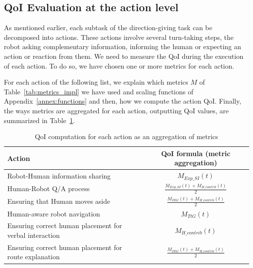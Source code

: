 \documentclass[a4paper,11pt,twoside]{StyleThese}
\begin{document}
\subsection{QoI Evaluation at the action level}\label{subsec:action_qoi}
As mentioned earlier, each subtask of the direction-giving task can be decomposed into actions. These actions involve several turn-taking steps, the robot asking complementary information, informing the human or expecting an action or reaction from them. We need to measure the QoI during the execution of each action. To do so, we have chosen one or more metrics for each action. 

For each action of the following list, we explain which metrics $M$ of Table~\ref{tab:metrics_impl} we have used and scaling functions of Appendix~\ref{annex:functions} and then, how we compute the action QoI. Finally, the ways metrics are aggregated for each action, outputting QoI values, are summarized in Table~\ref{tab:qoi}.

\begin{table}[!hbt]
	\centering
	\begin{tabular}{|p{3.5cm}|c|}
		Action & QoI formula (metric aggregation) \\ \hline \hline
		Robot-Human information sharing & $ M_{Exp\_SI}(t)$ \\ \hline
		Human-Robot Q/A process & \(\displaystyle\frac{M_{Exp\_SI}(t) + M_{H\_contrib}(t) }{2}\) \\ \hline
		Ensuring  that  Human  moves  aside  & \(\displaystyle\frac{M_{DtG}(t) + M_{H\_contrib}(t) }{2}\) \\ \hline
		Human-aware robot navigation  & $M_{TtG}(t)$ \\ \hline
		Ensuring correct human placement for verbal interaction & $M_{H\_contrib}(t)$ \\ \hline
		Ensuring correct human placement for route explanation & \(\displaystyle\frac{M_{DtG}(t) + M_{H\_contrib}(t) }{2}\) 
	\end{tabular}
	\caption{QoI computation for each action as an aggregation of metrics}
	\label{tab:qoi}
\end{table}
\end{document}
